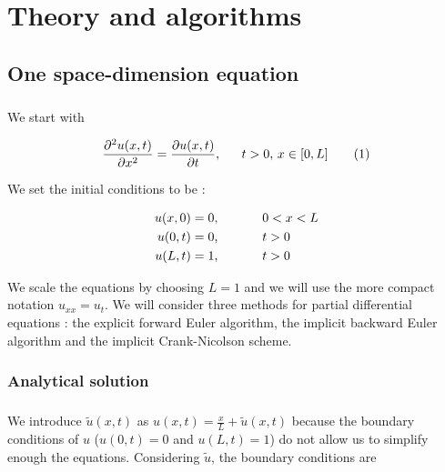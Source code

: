 \documentclass[a4paper, twoside, 11pt]{report}
\theoremstyle{theorem}
\theoremstyle{remark}
\theoremstyle{exemple}
\begin{document}
\chapter{Theory and algorithms}

    \section{One space-dimension equation}

        \paragraph{}We start with

        \begin{equation*}
                \frac{\partial^2u(x,t)}{\partial x^2}=\frac{\partial u(x,t)}{\partial t}\text{, \hspace{0.5cm}$t>0$, $x\in[0,L]$}
                \tag{1}
            \end{equation*}

            We set the initial conditions to be :

            \begin{align*}
                u(x,0)&=0\text{, \hspace{1cm} $0<x<L$}\\
                u(0,t)&=0\text{, \hspace{1cm} $t>0$}\\
                u(L,t)&=1\text{, \hspace{1cm} $t>0$}
            \end{align*}

        We scale the equations by choosing $L=1$ and we will use the more compact notation $u_{xx}=u_t$. We will consider three methods for partial differential equations : the explicit forward Euler algorithm, the implicit backward Euler algorithm and the implicit Crank-Nicolson scheme.

            \subsection{Analytical solution}

                \paragraph{}We introduce $\widetilde{u}(x,t)$ as $u(x,t)=\frac{x}{L} + \widetilde{u}(x,t)$ because the boundary conditions of $u$ ($u(0,t)=0$ and $u(L,t)=1$) do not allow us to simplify enough the equations. Considering $\widetilde{u}$, the boundary conditions are
\end{document}
